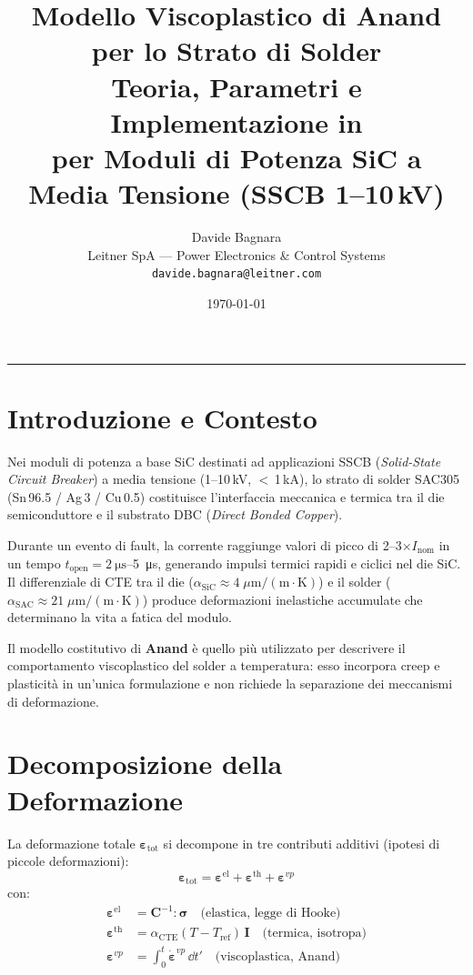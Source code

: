 \documentclass[11pt,a4paper]{article}
\title{%
  \textbf{Modello Viscoplastico di Anand per lo Strato di Solder \sac{}}\\[4pt]
  \large Teoria, Parametri e Implementazione in \comsol{}\\
  \large per Moduli di Potenza SiC a Media Tensione (SSCB 1--10\,kV)
}
\author{Davide Bagnara\\
  \small Leitner SpA --- Power Electronics \& Control Systems\\
  \small \texttt{davide.bagnara@leitner.com}
}
\date{\today}
\newcommand{\tens}[1]{\bm{#1}}
\newcommand{\sac}{SAC305}
\begin{document}
\maketitle
\tableofcontents
\bigskip
\hrule
\bigskip

\section{Introduzione e Contesto}

Nei moduli di potenza a base SiC destinati ad applicazioni SSCB (\emph{Solid-State
Circuit Breaker}) a media tensione (1--10\,kV, $<$\,1\,kA), lo strato di solder
\sac{} (Sn\,96.5 / Ag\,3 / Cu\,0.5) costituisce l'interfaccia meccanica e termica
tra il die semiconduttore e il substrato DBC (\emph{Direct Bonded Copper}).

Durante un evento di fault, la corrente raggiunge valori di picco di 2--3$\times
I_{\mathrm{nom}}$ in un tempo $t_{\mathrm{open}} = \SI{2}{\micro\second}$--\SI{5}{\micro\second},
generando impulsi termici rapidi e ciclici nel die SiC. Il differenziale di CTE
tra il die ($\alpha_{\mathrm{SiC}} \approx 4\;\mu\mathrm{m/(m\cdot K)}$) e il solder
($\alpha_{\mathrm{SAC}} \approx 21\;\mu\mathrm{m/(m\cdot K)}$) produce deformazioni
inelastiche accumulate che determinano la vita a fatica del modulo.

Il modello costitutivo di \textbf{Anand} \cite{Anand1985} è quello più utilizzato
per descrivere il comportamento viscoplastico del solder a temperatura: esso
incorpora creep e plasticità in un'unica formulazione e non richiede la separazione
dei meccanismi di deformazione.

\section{Decomposizione della Deformazione}

La deformazione totale $\tens{\varepsilon}_{\mathrm{tot}}$ si decompone in tre
contributi additivi (ipotesi di piccole deformazioni):
%
\begin{equation}
  \tens{\varepsilon}_{\mathrm{tot}}
  = \tens{\varepsilon}^{\mathrm{el}}
  + \tens{\varepsilon}^{\mathrm{th}}
  + \tens{\varepsilon}^{vp}
  \label{eq:decomp}
\end{equation}
%
con:
\begin{align}
  \tens{\varepsilon}^{\mathrm{el}} &= \mathbf{C}^{-1} : \tens{\sigma}
  \quad \text{(elastica, legge di Hooke)} \label{eq:el}\\
  \tens{\varepsilon}^{\mathrm{th}} &= \alpha_{\mathrm{CTE}}(T-T_{\mathrm{ref}})\,\mathbf{I}
  \quad \text{(termica, isotropa)} \label{eq:th}\\
  \tens{\varepsilon}^{vp} &= \int_0^t \dot{\tens{\varepsilon}}^{vp}\,\dd t'
  \quad \text{(viscoplastica, Anand)} \label{eq:vp}
\end{align}
\end{document}
